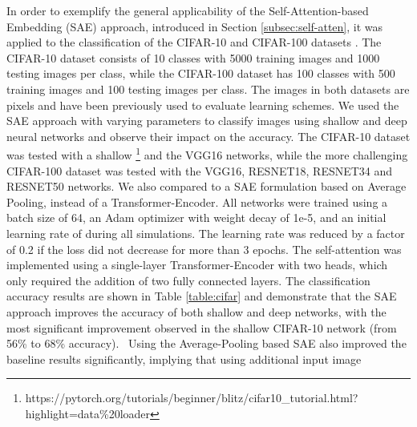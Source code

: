 \documentclass[10pt,journal]{IEEEtran}\usepackage{amsfonts}
\begin{document}
In order to exemplify the general applicability of the Self-Attention-based
Embedding (SAE) approach, introduced in Section \ref{subsec:self-atten}, it
was applied to the classification of the CIFAR-10 and CIFAR-100 datasets
\cite{CIFAR}. The CIFAR-10 dataset consists of 10 classes with 5000 training
images and 1000 testing images per class, while the CIFAR-100 dataset has 100
classes with 500 training images and 100 testing images per class. The images
in both datasets are  pixels and have been previously used to
evaluate learning schemes. We used the SAE approach with varying parameters to
classify images using shallow and deep neural networks and observe their
impact on the accuracy. The CIFAR-10 dataset was tested with a shallow
\footnote{https://pytorch.org/tutorials/beginner/blitz/cifar10\_tutorial.html?highlight=data\%20loader}
and the VGG16 networks, while the more challenging CIFAR-100 dataset was
tested with the VGG16, RESNET18, RESNET34 and RESNET50 networks. We also
compared to a SAE formulation based on Average Pooling, instead of a
Transformer-Encoder. All networks were trained using a batch size of 64, an
Adam optimizer with weight decay of 1e-5, and an initial learning rate of
 during all simulations. The learning rate was reduced by a factor of
0.2 if the loss did not decrease for more than 3 epochs. The self-attention
was implemented using a single-layer Transformer-Encoder with two heads, which
only required the addition of two fully connected layers. The classification
accuracy results are shown in Table \ref{table:cifar} and demonstrate that the
SAE approach improves the accuracy of both shallow and deep networks, with the
most significant improvement observed in the shallow CIFAR-10 network (from
56\% to 68\% accuracy). \ Using the Average-Pooling based SAE also improved
the baseline results significantly, implying that using additional input image
\end{document}
